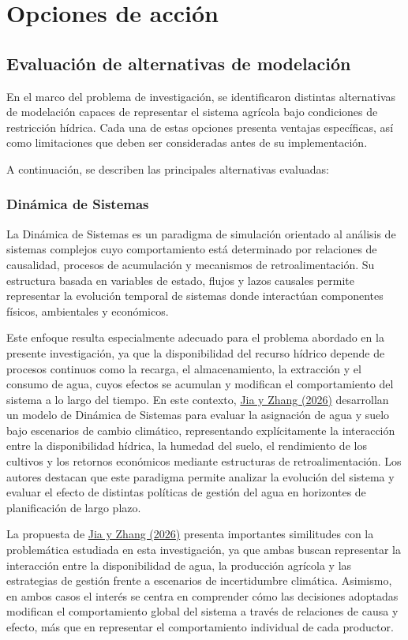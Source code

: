 \documentclass[12pt]{report}
\newcommand{\citeref}[2]{\hyperlink{ref:#1}{#2}}
\begin{document}
\chapter{Opciones de acción}

\section{Evaluación de alternativas de modelación}

En el marco del problema de investigación, se identificaron distintas alternativas de modelación capaces de representar el sistema agrícola bajo condiciones de restricción hídrica. Cada una de estas opciones presenta ventajas específicas, así como limitaciones que deben ser consideradas antes de su implementación.

A continuación, se describen las principales alternativas evaluadas:

\subsection{Dinámica de Sistemas}

La Dinámica de Sistemas es un paradigma de simulación orientado al análisis de sistemas complejos cuyo comportamiento está determinado por relaciones de causalidad, procesos de acumulación y mecanismos de retroalimentación. Su estructura basada en variables de estado, flujos y lazos causales permite representar la evolución temporal de sistemas donde interactúan componentes físicos, ambientales y económicos.

Este enfoque resulta especialmente adecuado para el problema abordado en la presente investigación, ya que la disponibilidad del recurso hídrico depende de procesos continuos como la recarga, el almacenamiento, la extracción y el consumo de agua, cuyos efectos se acumulan y modifican el comportamiento del sistema a lo largo del tiempo. En este contexto, \citeref{jia2026}{Jia y Zhang (2026)} desarrollan un modelo de Dinámica de Sistemas para evaluar la asignación de agua y suelo bajo escenarios de cambio climático, representando explícitamente la interacción entre la disponibilidad hídrica, la humedad del suelo, el rendimiento de los cultivos y los retornos económicos mediante estructuras de retroalimentación. Los autores destacan que este paradigma permite analizar la evolución del sistema y evaluar el efecto de distintas políticas de gestión del agua en horizontes de planificación de largo plazo.

La propuesta de \citeref{jia2026}{Jia y Zhang (2026)} presenta importantes similitudes con la problemática estudiada en esta investigación, ya que ambas buscan representar la interacción entre la disponibilidad de agua, la producción agrícola y las estrategias de gestión frente a escenarios de incertidumbre climática. Asimismo, en ambos casos el interés se centra en comprender cómo las decisiones adoptadas modifican el comportamiento global del sistema a través de relaciones de causa y efecto, más que en representar el comportamiento individual de cada productor.
\end{document}
